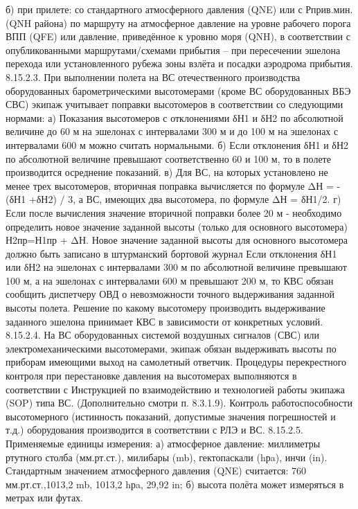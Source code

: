 б)	при прилете: со стандартного атмосферного давления (QNE) или с Рприв.мин. (QNH района) по маршруту на атмосферное давление на уровне рабочего порога ВПП (QFE) или давление, приведённое к уровню моря (QNH), в соответствии с опубликованными маршрутами/схемами прибытия – при пересечении эшелона перехода или установленного рубежа зоны взлёта и посадки аэродрома прибытия.
8.15.2.3. При выполнении полета на ВС отечественного производства оборудованных барометрическими высотомерами (кроме ВС оборудованных ВБЭ СВС) экипаж учитывает поправки высотомеров в соответствии со следующими нормами:
а)	Показания высотомеров с отклонениями δН1 и δН2 по абсолютной величине до 60 м на эшелонах с интервалами 300 м и до 100 м на эшелонах с интервалами 600 м можно считать нормальными. 
б)	Если отклонения δН1 и δН2 по абсолютной величине превышают соответственно 60 и 100 м, то в полете производится осреднение показаний.
в)	Для ВС, на которых установлено не менее трех высотомеров, вторичная поправка вычисляется по формуле ΔН = - (δН1 +δН2) / 3, а ВС, имеющих два высотомера, по формуле ΔН = δН1/2.
г)	Если после вычисления значение вторичной поправки более 20 м - необходимо определить новое значение заданной высоты (только для основного высотомера) Н2пр=Н1пр + ΔН. Новое значение заданной высоты для основного высотомера должно быть записано в штурманский бортовой журнал Если отклонения δН1 или δН2 на эшелонах с интервалами 300 м по абсолютной величине превышают 100 м, а на эшелонах с интервалами 600 м превышают 200 м, то КВС обязан сообщить диспетчеру ОВД о невозможности точного выдерживания заданной высоты полета. Решение по какому высотомеру производить выдерживание заданного эшелона принимает КВС в зависимости от конкретных условий.
8.15.2.4. На ВС оборудованных системой воздушных сигналов (СВС) или электромеханическими высотомерами, экипаж обязан выдерживать высоты по приборам имеющими выход на самолетный ответчик. 
Процедуры перекрестного контроля при перестановке давления на высотомерах выполняются в соответствии с Инструкцией по взаимодействию и технологией работы экипажа (SOP) типа ВС. (Дополнительно смотри п. 8.3.1.9). Контроль работоспособности высотомерного (истинность показаний, допустимые значения погрешностей и т.д.) оборудования производится в соответствии с РЛЭ и ВС.
8.15.2.5. Применяемые единицы измерения:
а)	атмосферное давление: миллиметры ртутного столба (мм.рт.ст.), милибары (mb), гектопаскали (hрa), инчи (in). Стандартным значением атмосферного давления (QNE) считается: 760 мм.рт.ст.,1013,2 mb, 1013,2 hрa, 29,92 in;
б)	высота полёта может измеряться в метрах или футах. 
